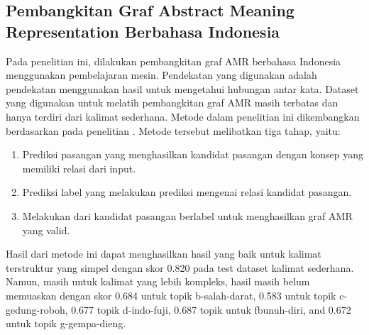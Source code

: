 \subsection{Pembangkitan Graf Abstract Meaning Representation Berbahasa Indonesia }

Pada penelitian ini, dilakukan pembangkitan graf AMR berbahasa Indonesia menggunakan pembelajaran mesin.
Pendekatan yang digunakan adalah pendekatan menggunakan hasil  untuk mengetahui hubungan antar kata.
Dataset yang digunakan untuk melatih pembangkitan graf AMR masih terbatas dan hanya terdiri dari kalimat sederhana.
Metode dalam penelitian ini dikembangkan berdasarkan pada penelitian \textcite{zhang2019}.
Metode tersebut melibatkan tiga tahap, yaitu:
\begin{enumerate}
  \item Prediksi pasangan yang menghasilkan kandidat pasangan dengan konsep yang memiliki relasi dari input.
  \item Prediksi label yang melakukan prediksi mengenai relasi kandidat pasangan.
  \item Melakukan  dari kandidat pasangan berlabel untuk menghasilkan graf AMR yang valid.
\end{enumerate}

Hasil dari metode ini dapat menghasilkan hasil yang baik untuk kalimat terstruktur yang simpel dengan skor \SMATCH{} 0.820 pada test dataset kalimat sederhana.
Namun, masih untuk kalimat yang lebih kompleks, hasil masih belum memuaskan dengan skor \SMATCH{} 0.684 untuk topik b-salah-darat, 0.583 untuk topik c-gedung-roboh, 0.677 topik d-indo-fuji, 0.687 topik untuk fbunuh-diri, and 0.672 untuk topik g-gempa-dieng.
